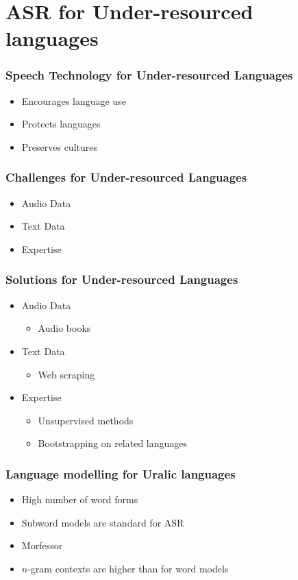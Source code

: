 \section[Under-resourced]{ASR for Under-resourced languages}
\begin{frame}
\frametitle{Speech Technology for Under-resourced Languages}
\begin{itemize}
\item Encourages language use
\item Protects languages
\item Preserves cultures
\end{itemize}
\end{frame}

\begin{frame}
\frametitle{Challenges for Under-resourced Languages}
\begin{itemize}
\item Audio Data
\item Text Data
\item Expertise
\end{itemize}
\end{frame}
%

\begin{frame}
\frametitle{Solutions for Under-resourced Languages}
\begin{itemize}
\item Audio Data
\begin{itemize}
\item Audio books
\end{itemize}
\item Text Data
\begin{itemize}
\item Web scraping
\end{itemize}
\item Expertise
\begin{itemize}
\item Unsupervised methods
\item Bootstrapping on related languages
\end{itemize}
\end{itemize}
\end{frame}


\begin{frame}
\frametitle{Language modelling for Uralic languages}
\begin{itemize}
\item High number of word forms
\item Subword models are standard for ASR
\item Morfessor
\item $n$-gram contexts are higher than for word models
\end{itemize}
\end{frame}


